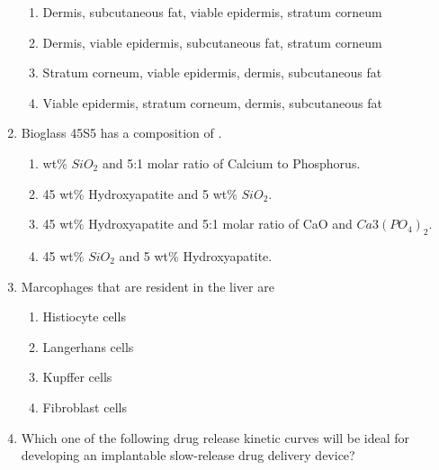 \documentclass[a4paper,12pt]{exam}
\numberwithin{equation}{enumi}
\numberwithin{figure}{enumi}
\begin{document}
\begin{enumerate}
\hfill{}

\begin{enumerate}
 \item Dermis, subcutaneous fat, viable epidermis, stratum corneum 
\item Dermis, viable epidermis, subcutaneous fat, stratum corneum
\item Stratum corneum, viable epidermis, dermis, subcutaneous fat 
\item Viable epidermis, stratum corneum, dermis, subcutaneous fat 
\end{enumerate}  

\item Bioglass 45S5 has a composition of \underline{\hspace{1.5cm}}.

\hfill{}

\begin{enumerate}
 \item wt\% $SiO_2$ and 5:1 molar ratio of Calcium to Phosphorus.
\item 45 wt\% Hydroxyapatite and 5 wt\% $SiO_2$. 
\item 45 wt\% Hydroxyapatite and 5:1 molar ratio of CaO and $Ca3(PO_4)_2$.
\item 45 wt\% $SiO_2$ and 5 wt\% Hydroxyapatite. 
\end{enumerate}  

\item Marcophages that are resident in the liver are

\hfill{}

\begin{enumerate}
    \item Histiocyte cells
    \item Langerhans cells
    \item Kupffer cells
    \item Fibroblast cells
\end{enumerate}

\item Which one of the following drug release kinetic curves will be ideal for developing an implantable slow-release drug delivery device?

\hfill{}


\end{enumerate}
\end{document}
